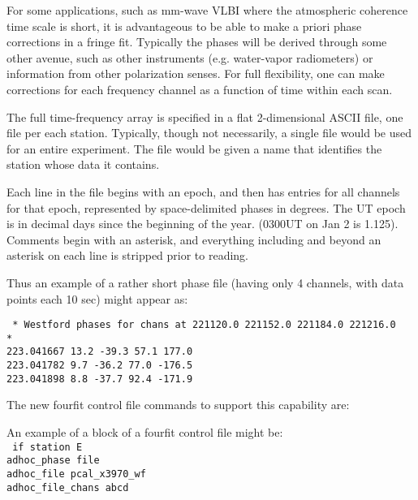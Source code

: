 For some applications, such as mm-wave VLBI where the atmospheric coherence time scale is short, it is advantageous to be able to make a priori phase corrections in a fringe fit. Typically the phases will be derived through some other avenue, such as other instruments (e.g. water-vapor radiometers) or information from other polarization senses. For full flexibility, one can make corrections for each frequency channel as a function of time within each scan. 

The full time-frequency array is specified in a flat 2-dimensional ASCII file, one file per each station. Typically, though not necessarily, a single file would be used for an entire experiment. The file would be given a name that identifies the station whose data it contains. 

Each line in the file begins with an epoch, and then has entries for all channels for that epoch, represented by space-delimited phases in degrees. The UT epoch is in decimal days since the beginning of the year. (0300UT on Jan 2 is 1.125). Comments begin with an asterisk, and everything including and beyond an asterisk on each line is stripped prior to reading.

Thus an example of a rather short phase file (having only 4 channels, with data points each 10 sec) might appear as:

\texttt{
* Westford phases for chans at 221120.0 221152.0 221184.0 221216.0 \\
* \\
223.041667 13.2 -39.3 57.1 177.0 \\
223.041782 9.7 -36.2 77.0 -176.5 \\
223.041898 8.8 -37.7 92.4 -171.9 \\
}

The new fourfit control file commands to support this capability are: \\

An example of a block of a fourfit control file might be: \\
\texttt{
if station E \\
adhoc\_phase file \\
adhoc\_file pcal\_x3970\_wf \\
adhoc\_file\_chans abcd \\
}

